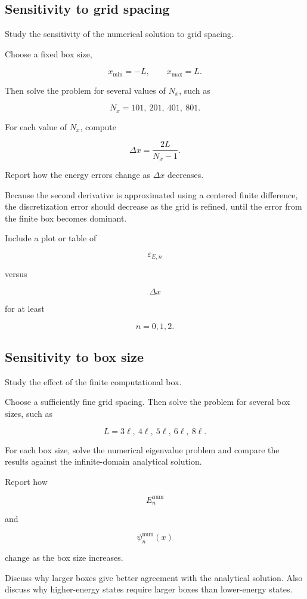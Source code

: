\subsection{Sensitivity to grid spacing}

Study the sensitivity of the numerical solution to grid spacing.

Choose a fixed box size,

\[
x_{\min}=-L,
\qquad
x_{\max}=L.
\]

Then solve the problem for several values of \(N_x\), such as

\[
N_x=101,\ 201,\ 401,\ 801.
\]

For each value of \(N_x\), compute

\[
\Delta x
=
\frac{2L}{N_x-1}.
\]

Report how the energy errors change as \(\Delta x\) decreases.

Because the second derivative is approximated using a centered finite difference, the discretization error should decrease as the grid is refined, until the error from the finite box becomes dominant.

Include a plot or table of

\[
\varepsilon_{E,n}
\]

versus

\[
\Delta x
\]

for at least

\[
n=0,1,2.
\]

\subsection{Sensitivity to box size}

Study the effect of the finite computational box.

Choose a sufficiently fine grid spacing. Then solve the problem for several box sizes, such as

\[
L=3\ell,\ 4\ell,\ 5\ell,\ 6\ell,\ 8\ell.
\]

For each box size, solve the numerical eigenvalue problem and compare the results against the infinite-domain analytical solution.

Report how

\[
E_n^{\mathrm{num}}
\]

and

\[
\psi_n^{\mathrm{num}}(x)
\]

change as the box size increases.

Discuss why larger boxes give better agreement with the analytical solution. Also discuss why higher-energy states require larger boxes than lower-energy states.

